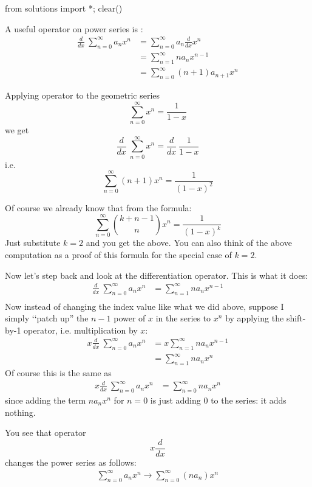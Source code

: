 \begin{python0}
from solutions import *; clear() 
\end{python0}

A useful operator on power series is :
\begin{align*}
\frac{d}{dx} \ \sum^\infty_{n = 0} a_n x^n 
&= \sum_{n = 0}^\infty a_n \frac{d}{dx} x^n \\
&= \sum_{n=1}^\infty na_n x^{n-1} \\
&= \sum_{n = 0}^\infty (n+1)a_{n+1} x^n 
\end{align*}

Applying operator to the geometric series 
\[
\sum_{n=0}^\infty x^n = \frac{1}{1-x}
\]
we get
\[
\frac{d}{dx} \ \sum_{n=0}^\infty x^n = \frac{d}{dx} \ \frac{1}{1-x}
\]
i.e.
\[
\sum_{n=0}^\infty (n+1) x^n = \frac{1}{(1-x)^{2}}
\]

Of course we already know that from the formula:
\[
\sum_{n=0}^\infty \binom{k+n-1}{n} x^n = \frac{1}{(1-x)^{k}}
\]
Just substitute $k = 2$ and you get the above.
You can also think of the above computation as a proof of this
formula for the special case of $k = 2$.

Now let's step back and look at the differentiation operator.
This is what it does:
\begin{align*}
\frac{d}{dx} \ \sum^\infty_{n = 0} a_n x^n 
&= \sum_{n=1}^\infty na_n x^{n-1} \\
\end{align*}
Now instead of changing the index value like what we did above,
suppose I simply \lq\lq patch up'' the $n-1$ power of $x$ in the series
to $x^n$ by applying the shift-by-1 operator, i.e. multiplication by $x$:
\begin{align*}
x\frac{d}{dx} \ \sum^\infty_{n = 0} a_n x^n 
&= x\sum_{n=1}^\infty na_n x^{n-1} \\
&= \sum_{n=1}^\infty na_n x^{n}
\end{align*}
Of course this is the same as
\begin{align*}
x\frac{d}{dx} \ \sum^\infty_{n = 0} a_n x^n 
&= \sum_{n=0}^\infty na_n x^{n}
\end{align*}
since adding the term $n a_n x^n$ for $n=0$ is just adding $0$ to the series:
it adds nothing.

You see that operator
\[
x \frac{d}{dx}
\]
changes the power series as follows:
\begin{align*}
\sum^\infty_{n = 0} a_n x^n  \rightarrow
\sum_{n=0}^\infty (na_n) x^n
\end{align*}

